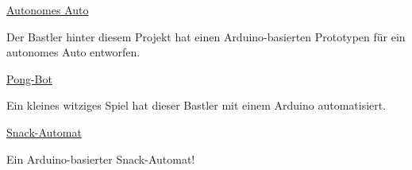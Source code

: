 \vfill
\begin{links}
	\item \href{https://www.instructables.com/id/Self-Driving-Car-Using-Arduinoautonomous-Guided-Ve/}{Autonomes Auto}
	
	Der Bastler hinter diesem Projekt hat einen Arduino-basierten Prototypen für ein autonomes Auto entworfen.
	
	\item \href{https://www.instructables.com/id/Arduino-Controlled-Game-Pong-Bot-Vs-Human/}{Pong-Bot}
	
	Ein kleines witziges Spiel hat dieser Bastler mit einem Arduino automatisiert.
	
	\item \href{https://www.instructables.com/id/Snack-Vending-Machine-Powered-by-Arduino/}{Snack-Automat}
	
	Ein Arduino-basierter Snack-Automat!
\end{links}